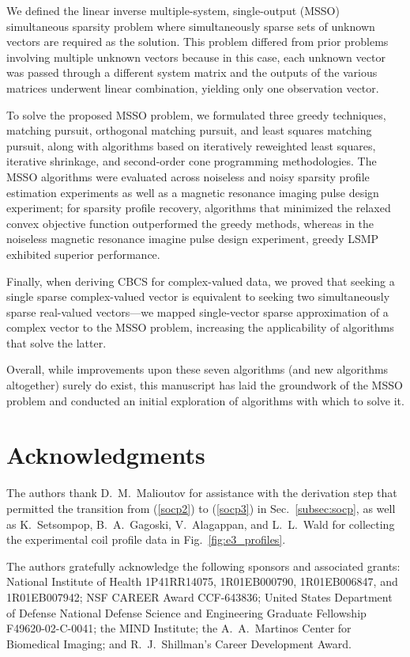 \documentclass[final]{siamltex}
\begin{document}
  We defined the linear inverse multiple-system, single-output (MSSO)
  simultaneous sparsity problem where simultaneously sparse sets of
  unknown vectors are required as the solution.  This problem differed
  from prior problems involving multiple unknown vectors because in
  this case, each unknown vector was passed through a different system
  matrix and the outputs of the various matrices underwent linear
  combination, yielding only one observation vector.

  To solve the proposed MSSO problem, we formulated three greedy
  techniques, matching pursuit, orthogonal matching pursuit, and least
  squares matching pursuit, along with algorithms based on iteratively
  reweighted least squares, iterative shrinkage, and second-order cone
  programming methodologies. The MSSO algorithms were evaluated across
  noiseless and noisy sparsity profile estimation experiments as well
  as a magnetic resonance imaging pulse design experiment; for
  sparsity profile recovery, algorithms that minimized the relaxed
  convex objective function outperformed the greedy methods, whereas
  in the noiseless magnetic resonance imagine pulse design experiment,
  greedy LSMP exhibited superior performance.

  Finally, when deriving CBCS for complex-valued data, we proved that
  seeking a single sparse complex-valued vector is equivalent to
  seeking two simultaneously sparse real-valued vectors---we mapped
  single-vector sparse approximation of a complex vector to the MSSO
  problem, increasing the applicability of algorithms that solve the
  latter.

  Overall, while improvements upon these seven algorithms (and new
  algorithms altogether) surely do exist, this manuscript has laid the
  groundwork of the MSSO problem and conducted an initial exploration
  of algorithms with which to solve it.

\section*{Acknowledgments} 

   The authors thank D.~M.~Malioutov for assistance with the
   derivation step that permitted the transition from (\ref{socp2}) to
   (\ref{socp3}) in Sec.~\ref{subsec:socp}, as well as K.~Setsompop,
   B.~A.~Gagoski, V.~Alagappan, and L.~L.~Wald for collecting the
   experimental coil profile data in Fig.~\ref{fig:e3_profiles}.

   The authors gratefully acknowledge the
   following sponsors and associated grants: National Institute of Health
   1P41RR14075, 1R01EB000790, 1R01EB006847, and 1R01EB007942; NSF
   CAREER Award CCF-643836; United States Department of Defense
   National Defense Science and Engineering Graduate Fellowship
   F49620-02-C-0041; the MIND Institute; the A.~A.~Martinos Center for
   Biomedical Imaging; and R.~J.~Shillman's Career Development Award.



\end{document}
